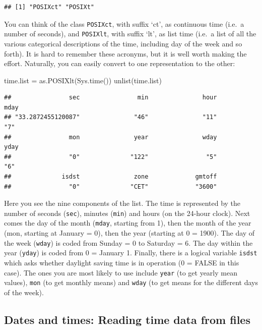 \documentclass[
]{book}
\newenvironment{Shaded}{\begin{snugshade}}{\end{snugshade}}
\newcommand{\FunctionTok}[1]{\textcolor[rgb]{0.00,0.00,0.00}{#1}}
\newcommand{\NormalTok}[1]{#1}
\newcommand{\OtherTok}[1]{\textcolor[rgb]{0.56,0.35,0.01}{#1}}
\begin{document}
\begin{verbatim}
## [1] "POSIXct" "POSIXt"
\end{verbatim}

You can think of the class \texttt{POSIXct}, with suffix `ct', as continuous time (i.e.~a number of seconds), and
\texttt{POSIXlt}, with suffix `lt', as list time (i.e.~a list of all the various categorical descriptions of the time,
including day of the week and so forth). It is hard to remember these acronyms, but it is well worth making
the effort. Naturally, you can easily convert to one representation to the other:

\begin{Shaded}
\begin{Highlighting}[]
\NormalTok{time.list }\OtherTok{=} \FunctionTok{as.POSIXlt}\NormalTok{(}\FunctionTok{Sys.time}\NormalTok{())}
\FunctionTok{unlist}\NormalTok{(time.list)}
\end{Highlighting}
\end{Shaded}

\begin{verbatim}
##                sec                min               hour               mday 
## "33.2872455120087"               "46"               "11"                "7" 
##                mon               year               wday               yday 
##                "0"              "122"                "5"                "6" 
##              isdst               zone             gmtoff 
##                "0"              "CET"             "3600"
\end{verbatim}

Here you see the nine components of the list. The time is represented by the number of seconds (\texttt{sec}), minutes (\texttt{min}) and hours (on the 24-hour clock). Next comes the day of the month (\texttt{mday}, starting from 1), then the month of the year (mon, starting at January = 0), then the year (starting at 0 = 1900). The day of the week (\texttt{wday}) is coded from Sunday = 0 to Saturday = 6. The day within the year (\texttt{yday}) is coded from 0 = January 1. Finally, there is a logical variable \texttt{isdst} which asks whether daylight saving time is in operation (0 = FALSE in this case). The ones you are most likely to use include \texttt{year} (to get yearly mean values), \texttt{mon} (to get monthly means) and \texttt{wday} (to get means for the different days of the week).

\hypertarget{dates-and-times-reading-time-data-from-files}{%
\subsection{Dates and times: Reading time data from files}\label{dates-and-times-reading-time-data-from-files}}
\end{document}

